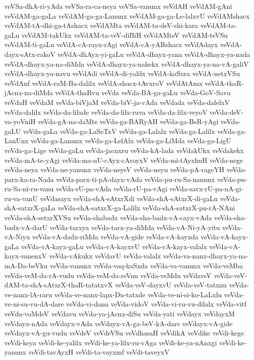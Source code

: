 {veVSa-dhA-ri-yAda
veVSa-ra-ca-neya
veVSa-vanunx
veVdAH
veVdAM-gAni
veVdAM-ga-gaLa
veVdAM-ga-ga-Lanunx
veVdAM-ga-ga-Le-lalxvU
veVdAMshacx
veVdAM-tA-dhi-ga-tAshacx
veVdAMta
veVdAM-ta-deV-shi-kara
veVdAM-ta-gaLu
veVdAM-takUkx
veVdAM-ta-veV-diBiH
veVdAMteV
veVdAM-teVSu
veVdAM-ti-gaLu
veVdA-cA-rayx-rAgi
veVdA-cA-yARshacx
veVdAdayx
veVdA-dayx-sAtx-rakoV
veVdA-dhAyx-yi-gaLu
veVdA-dhayx-yana
veVdA-dhayx-ya-nada
veVdA-dhayx-ya-na-diMda
veVdA-dhayx-ya-nakekx
veVdA-dhayx-ya-na-vA-galiV
veVdA-dhayx-ya-navu
veVdAdi
veVdA-di-yalilx
veVdA-kaSxra
veVdA-netxVSu
veVdAnf
veVdA-raM-Ba-dalilx
veVdA-shacx-tAvxroV
veVdAtAmx
veVdA-thaR-jAcnx-na-diMda
veVdA-thaRvu
veVda
veVda-BA-ga-gaLu
veVda-GoV-Savu
veVdaH
veVdaM
veVda-biVjaM
veVda-biV-ja-vAda
veVdada
veVda-dalelxV
veVda-dalilx
veVda-da-lilxde
veVda-da-lilx-ruva
veVda-da-lilx-veyoV
veVda-deV-va-yoVniH
veVda-gA-na-daMte
veVda-ga-BARyAH
veVda-ga-BeR-yAgi
veVda-gaLU
veVda-gaLa
veVda-ga-LaSeTxV
veVda-ga-Lalalx
veVda-ga-Lalilx
veVda-ga-LanUnx
veVda-ga-Lanunx
veVda-ga-LelAlx
veVda-ga-LiMda
veVda-ga-LigU
veVda-ga-Lige
veVda-gaLu
veVda-jacnxru
veVda-kA-lada
veVdakUkx
veVdakekx
veVda-mA-te-yAgi
veVda-ma-nU-cAyx-cAroyxV
veVda-mi-tAyxhuH
veVda-nege
veVda-neya
veVda-ne-yanunx
veVda-neyeV
veVda-neyu
veVda-pA-rageYH
veVda-parx-ka-ra-Nada
veVda-parx-ti-pA-dayx-vAda
veVda-pu-ru-Sa-nanunx
veVda-pu-ru-Sa-ni-ru-vanu
veVda-rU-pa-vAda
veVda-rU-pa-vAgi
veVda-savx-rU-pa-nA-gi-ru-va-vanU
veVdasayx
veVda-shA-sAtxrXdi
veVda-shA-sAtxrX-di-gaLu
veVda-shA-satxrX-gaLa
veVda-shA-satxrX-ga-Lalilx
veVda-shA-satxrX-pu-rA-NAni
veVda-shA-setxrXVSu
veVda-shabadx
veVda-sha-badx-vA-cayx-vAda
veVda-sha-badx-vA-darU
veVda-tarxya
veVda-tarx-ya-diMda
veVda-vA-Ni-yA-yitu
veVda-vA-Niyu
veVda-vA-dadx-riMda
veVda-vA-gide
veVda-vA-kayxda
veVda-vA-kayx-gaLa
veVda-vA-kayx-gaLu
veVda-vA-kayxvU
veVda-vA-kayx-valalx
veVda-vA-kayx-vanenxV
veVda-vAkukx
veVdavU
veVda-valalx
veVda-va-nanx-dhayx-ya-na-mA-Da-beVku
veVda-vanunx
veVda-vaq-kaSxda
veVda-va-vanunx
veVda-veMba
veVda-veM-da-rA-vudu
veVda-veM-da-reVnu
veVda-veMdu
veVdaveV
veVda-veV-dAM-ta-shA-sAtxrX-thaR-tatatxvX
veVda-veV-dayxvU
veVda-veV-tatxnu
veVda-ve-nanx-lA-raru
veVda-ve-nanx-lapx-Du-tatxde
veVda-ve-ni-si-ko-LaLxlu
veVda-ve-ni-su-vu-dA-dare
veVda-vi-danu
veVda-vidoV
veVda-vi-ru-vu-dilalx
veVda-vitf
veVda-voMdeV
veVdavu
veVda-ya-jAcnx-diSu
veVda-yati
veVdayx
veVdayxM
veVdayx-nAda
veVdayx-vAda
veVdayx-vA-ga-beV-kA-dare
veVdayx-vA-gide
veVdayx-vA-gu-vudu
veVdeV
veVdeVSu
veVdhasaH
veVdikA
veVdike
veVdi-kege
veVdi-keya
veVdi-ke-yalilx
veVdi-ke-ya-lilx-ru-vAga
veVdi-ke-ya-nAnxgi
veVdi-ke-yanunx
veVdi-tavAyxH
veVdi-ta-vayxmf
veVdi-taveyxV
}
